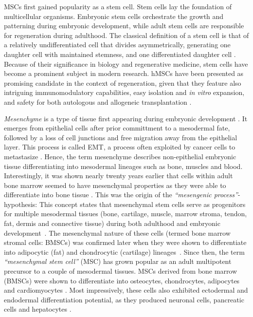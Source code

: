 \acp{MSC} first gained popularity as a stem cell. Stem cells lay the foundation
of multicellular organisms. Embryonic stem cells orchestrate the growth and
patterning during embryonic development, while adult stem cells are responsible
for regeneration during adulthood. The classical definition of a stem cell is
that of a relatively undifferentiated cell that divides asymmetrically,
generating one daughter cell with maintained stemness, and one differentiated
daughter cell \cite{cooperCellProliferationDevelopment2000,
    shenghuiMechanismsStemCell2009}. Because of their significance in biology and
regenerative medicine, stem cells have become a prominent subject in modern
research. \acp{hMSC} have been presented as promising candidate in the context
of regeneration, given that they feature also intriguing immunomodulatory
capabilities, easy isolation and \textit{in vitro} expansion, and safety for
both autologous and allogeneic transplantation
\cite{ullahHumanMesenchymalStem2015}.


\emph{Mesenchyme} is a type of tissue first appearing during embryonic
development . It emerges from
epithelial cells after prior committment to a mesodermal fate, followed by a
loss of cell junctions and free migration away from the epithelial layer. This
process is called \acf{EMT}, a process often exploited by cancer cells to
metastasize \cite{tamFormationMesodermalTissues1987,
nowotschinCellularDynamicsEarly2010}. Hence, the term mesenchyme describes
non-epithelial embryonic tissue differentiating into mesodermal lineages such as
bone, muscles and blood. Interestingly, it was shown nearly twenty years earlier
that cells within adult bone marrow seemed to have mesenchymal properties as
they were able to differentiate into bone tissue
\cite{friedensteinOsteogenesisTransplantsBone1966,
friedensteinOsteogenicPrecursorCells1971, biancoMesenchymalStemCells2014}. This
was the origin of the \emph{``mesengenic process''}-hypothesis: This concept
states that mesenchymal stem cells serve as progenitors for multiple mesodermal
tissues (bone, cartilage, muscle, marrow stroma, tendon, fat, dermis and
connective tissue) during both adulthood and embryonic
development~\cite{caplanMesenchymalStemCells1991,caplanMesengenicProcess1994}.
The mesenchymal nature of these cells (termed bone marrow stromal cells:
\acp{BMSC}) was confirmed later when they were shown to differentiate into
adipocytic (fat) and chondrocytic (cartilage)
lineages~\cite{pittengerMultilineagePotentialAdult1999}. Since then, the term
\emph{``mesenchymal stem cell''} (MSC) has grown popular as an adult multipotent
precursor to a couple of mesodermal tissues. \acp{MSC} derived from bone marrow
(\acp{BMSC}) were shown to differentiate into osteocytes, chondrocytes,
adipocytes and cardiomyocytes \cite{gronthosSTRO1FractionAdult1994,
muruganandanAdipocyteDifferentiationBone2009, xuMesenchymalStemCells2004}. Most
impressively, these cells also exhibited ectodermal and endodermal
differentiation potential, as they produced neuronal cells, pancreatic cells and
hepatocytes \cite{barzilayLentiviralDeliveryLMX1a2009,
wilkinsHumanBoneMarrowderived2009, gabrInsulinproducingCellsAdult2013,
stockHumanBoneMarrow2014}.

